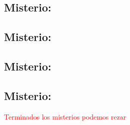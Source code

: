 \documentclass[10pt,oneside]{book}
\newcounter{glorious-counter}
\begin{document}
\begin{center}
      
\end{center}

\subsection*{ Misterio: }


\begin{center}
      
\end{center}

\subsection*{ Misterio: }


\begin{center}
      
\end{center}

\subsection*{ Misterio: }


\begin{center}
      
\end{center}

\subsection*{ Misterio: }


\begin{center}
      {}
\end{center}
\label{final-prayer}
\begin{center}
      \textcolor{red}{Terminados los misterios podemos rezar}
\end{center}
\end{document}

